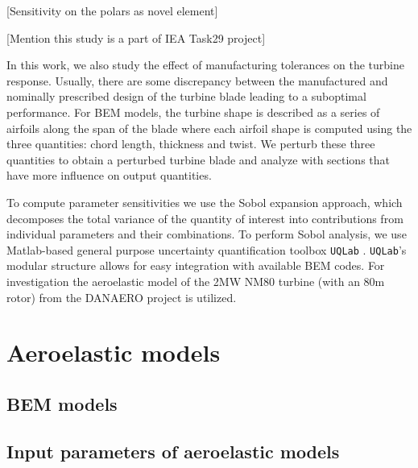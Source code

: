 \documentclass[review]{elsarticle}
\numberwithin{equation}{section}
\numberwithin{equation}{section}
\begin{document}
[Sensitivity on the polars as novel element]

[Mention this study is a part of IEA Task29 project]

In this work, we also study the effect of manufacturing tolerances on the turbine response. Usually, there are some discrepancy between the  manufactured and nominally prescribed design of the turbine blade leading to a suboptimal performance. For BEM models, the turbine shape is described as a series of airfoils along the span of the blade where each airfoil shape is computed using the three quantities: chord length, thickness and twist. We perturb these three quantities to obtain a perturbed turbine blade and analyze with sections that have more influence on output quantities. 

To compute parameter sensitivities we use the Sobol expansion approach, which decomposes the total variance of the quantity of interest into contributions from individual parameters and their combinations. To perform Sobol analysis, we use Matlab-based general purpose uncertainty quantification toolbox \texttt{UQLab} \cite{uqlab}. \texttt{UQLab}'s modular structure allows for easy integration with available BEM codes. For investigation the aeroelastic model of the  2MW NM80 turbine (with an 80m rotor) from the DANAERO project \cite{DANAERO} is utilized.



\section{Aeroelastic models}
\subsection{BEM models}
\subsection{Input parameters of aeroelastic models}
\end{document}
